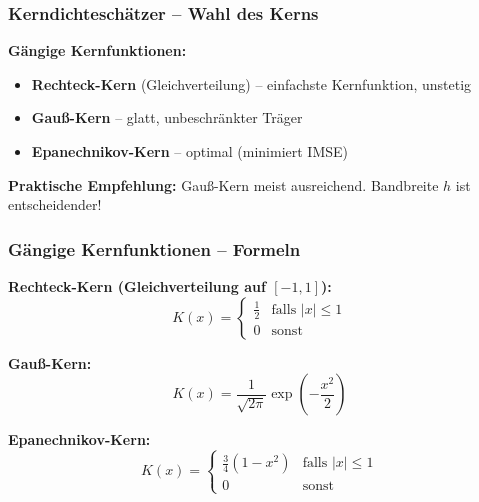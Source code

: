 \documentclass{beamer}
\newif\ifpauseswitch
\begin{document}
	\begin{frame}
		\frametitle{Kerndichteschätzer – Wahl des Kerns}
		
		\textbf{Gängige Kernfunktionen:}
		\begin{itemize}
			\itemsep8pt
			\item \textbf{Rechteck-Kern} (Gleichverteilung) – einfachste Kernfunktion, unstetig
			\item \textbf{Gauß-Kern} – glatt, unbeschränkter Träger
			\item \textbf{Epanechnikov-Kern} – optimal (minimiert IMSE)
		\end{itemize}
		
		\vspace{0.5em}
		
		\textbf{Praktische Empfehlung:} Gauß-Kern meist ausreichend. Bandbreite $h$ ist entscheidender!
	\end{frame}
	
	\begin{frame}
		\frametitle{Gängige Kernfunktionen – Formeln}
		
		\textbf{Rechteck-Kern (Gleichverteilung auf $[-1,1]$):}
		\[
		K(x) = \begin{cases}
			\frac{1}{2} & \text{falls } |x| \le 1 \\
			0 & \text{sonst}
		\end{cases}
		\]
		
		\vspace{0.5em}
		
		\ifpauseswitch
		\pause
		\fi
		
		\textbf{Gauß-Kern:}
		\[
		K(x) = \frac{1}{\sqrt{2\pi}} \exp\left(-\frac{x^2}{2}\right)
		\]
		
		\vspace{0.5em}
		
		\ifpauseswitch
		\pause
		\fi
		
		\textbf{Epanechnikov-Kern:}
		\[
		K(x) = \begin{cases}
			\frac{3}{4}(1-x^2) & \text{falls } |x| \le 1 \\
			0 & \text{sonst}
		\end{cases}
		\]
	\end{frame}
	
\end{document}
